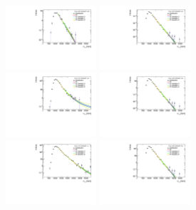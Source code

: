 \begin{figure}[htb!]
\begin{center}
\includegraphics[width=0.3\textwidth,angle=-90]{figures/boosted/Smooth/qcd_est_FourTag_Signal_mHH_pole_l.pdf}
\includegraphics[width=0.3\textwidth,angle=-90]{figures/boosted/Smooth/ttbar_est_FourTag_Signal_mHH_pole_l.pdf} \\ 
\includegraphics[width=0.3\textwidth,angle=-90]{figures/boosted/Smooth/qcd_est_ThreeTag_Signal_mHH_pole_l.pdf}
\includegraphics[width=0.3\textwidth,angle=-90]{figures/boosted/Smooth/ttbar_est_ThreeTag_Signal_mHH_pole_l.pdf}\\
\includegraphics[width=0.3\textwidth,angle=-90]{figures/boosted/Smooth/qcd_est_TwoTag_split_Signal_mHH_pole_l.pdf}
\includegraphics[width=0.3\textwidth,angle=-90]{figures/boosted/Smooth/ttbar_est_TwoTag_split_Signal_mHH_pole_l.pdf}\\

\end{center}
\end{figure}
